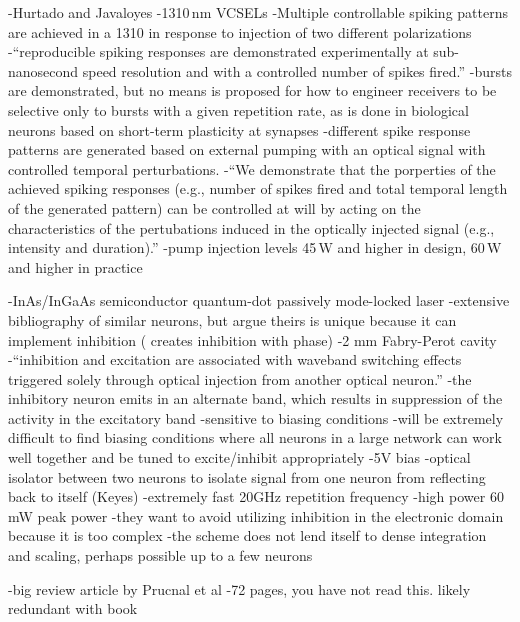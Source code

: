 \cite{huja2015}
-Hurtado and Javaloyes
-1310\,nm VCSELs
-Multiple controllable spiking patterns are achieved in a 1310 in response to injection of two different polarizations
-``reproducible spiking responses are demonstrated experimentally at sub-nanosecond speed resolution and with a controlled number of spikes fired.''
-bursts are demonstrated, but no means is proposed for how to engineer receivers to be selective only to bursts with a given repetition rate, as is done in biological neurons based on short-term plasticity at synapses
-different spike response patterns are generated based on external pumping with an optical signal with controlled temporal perturbations.
-``We demonstrate that the porperties of the achieved spiking responses (e.g., number of spikes fired and total temporal length of the generated pattern) can be controlled at will by acting on the characteristics of the pertubations induced in the optically injected signal (e.g., intensity and duration).''
-pump injection levels 45\,\textmu W and higher in design, 60\,\textmu W and higher in practice

\cite{meka2016}
-InAs/InGaAs semiconductor quantum-dot passively mode-locked laser
-extensive bibliography of similar neurons, but argue theirs is unique because it can implement inhibition (\cite{alva2013} creates inhibition with phase)
-2 mm Fabry-Perot cavity
-``inhibition and excitation are associated with waveband switching effects triggered solely through optical injection from another optical neuron.''
-the inhibitory neuron emits in an alternate band, which results in suppression of the activity in the excitatory band
-sensitive to biasing conditions
-will be extremely difficult to find biasing conditions where all neurons in a large network can work well together and be tuned to excite/inhibit appropriately
-5V bias
-optical isolator between two neurons to isolate signal from one neuron from reflecting back to itself (Keyes)
-extremely fast 20GHz repetition frequency
-high power 60 mW peak power
-they want to avoid utilizing inhibition in the electronic domain because it is too complex
-the scheme does not lend itself to dense integration and scaling, perhaps possible up to a few neurons




\cite{prsh2016}
-big review article by Prucnal et al
-72 pages, you have not read this. likely redundant with book

